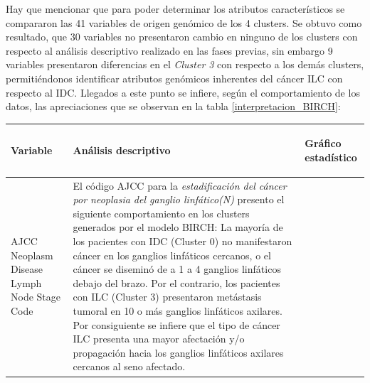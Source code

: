 Hay que mencionar que para poder determinar los atributos característicos se compararon las 41 variables de origen genómico de los 4 clusters. Se obtuvo como resultado, que 30 variables no presentaron cambio en ninguno de los clusters con respecto al análisis descriptivo realizado en las fases previas, sin embargo 9 variables presentaron diferencias en el \textit{Cluster 3} con respecto a los demás clusters, permitiéndonos identificar atributos genómicos inherentes del cáncer ILC con respecto al IDC. Llegados a este punto se infiere, según el comportamiento de los datos, las apreciaciones que se observan en la tabla \ref{interpretacion_BIRCH}:
\begin{table}[htb!]
	\footnotesize
	\begin{threeparttable}
		\begin{tabular}{p{2.5cm} p{7cm} p{6.5cm}} \toprule
			\begin{center}Variable\end{center}   	 
			&\begin{center}Análisis descriptivo\end{center}             
			&\begin{center}Gráfico estadístico\end{center}\\ \hline
			AJCC Neoplasm Disease Lymph Node Stage Code
			&  El código AJCC para la \textit{estadificación del cáncer por neoplasia del ganglio linfático(N)} presento el siguiente comportamiento en los clusters generados por el modelo BIRCH: La mayoría de los pacientes con IDC (Cluster 0) no manifestaron cáncer en los ganglios linfáticos cercanos, o el cáncer se diseminó de a 1 a 4 ganglios linfáticos debajo del brazo. Por el contrario, los pacientes con ILC (Cluster 3) presentaron metástasis tumoral en 10 o más ganglios linfáticos axilares. Por consiguiente se infiere que el tipo de cáncer ILC presenta una mayor afectación y/o propagación hacia los ganglios linfáticos axilares cercanos al seno afectado.
			

\end{tabular}
\end{threeparttable}
\end{table}
